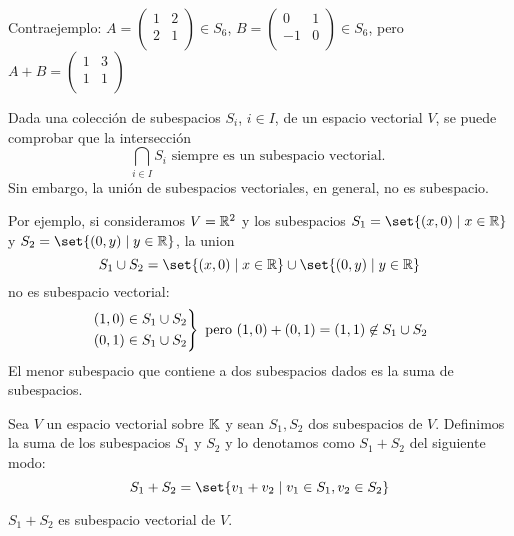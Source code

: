 \begin{example}
\begin{enumerate}
\begin{itemize}
			            Contraejemplo: \(A = \begin{pmatrix}
				            1 & 2 \\
				            2 & 1 \\
			            \end{pmatrix} \in S_6\), \(B = \begin{pmatrix}
				            0  & 1 \\
				            -1 & 0 \\
			            \end{pmatrix} \in S_6\), pero \(A + B = \begin{pmatrix}
				            1 & 3 \\
				            1 & 1 \\
			            \end{pmatrix}\)
		      \end{itemize}
	\end{enumerate}
\end{example}
\begin{proposition}
	Dada una colección de subespacios \(S_i \), \(i \in I \), de un espacio vectorial \(V \), se puede comprobar que la intersección
	\[
		\bigcap_{i \in I} S_i \text{ siempre es un subespacio vectorial. }
	\]
	Sin embargo, la unión de subespacios vectoriales, en general, no es subespacio.
\end{proposition}
Por ejemplo, si consideramos \(V = \mathbb{R}^{2 } \) y los subespacios \(S_1 = \set{(x,0) \mid x \in \R }\) y \(S_2 = \set{(0,y) \mid y \in \R }\), la union
\[
	S_1 \cup S_2 = \set{(x,0) \mid x \in \R} \cup \set{(0,y) \mid y \in \R }
\]
no es subespacio vectorial:
\[
	\begin{rcases}
		(1,0) \in S_1 \cup S_2 \\
		(0,1) \in S_1 \cup  S_2
	\end{rcases} \text{ pero } (1,0) + (0,1) = (1,1) \not\in S_1 \cup S_2
\]
El menor subespacio que contiene a dos subespacios dados es la suma de subespacios.
\begin{definition}
	Sea \(V \) un espacio vectorial sobre \(\mathbb{K} \) y sean \(S_1, S_2 \) dos subespacios de \(V \). Definimos la suma de los subespacios \(S_1 \) y \(S_2 \) y lo denotamos como \(S_1 + S_2 \) del siguiente modo:
	\[
		S_1 + S_2 = \set{v_1 + v_2 \mid v_1 \in S_1, v_2 \in S_2 }
	\]
\end{definition}
\begin{proposition}
	\(S_1 + S_2 \) es subespacio vectorial de \(V \).
\end{proposition}
